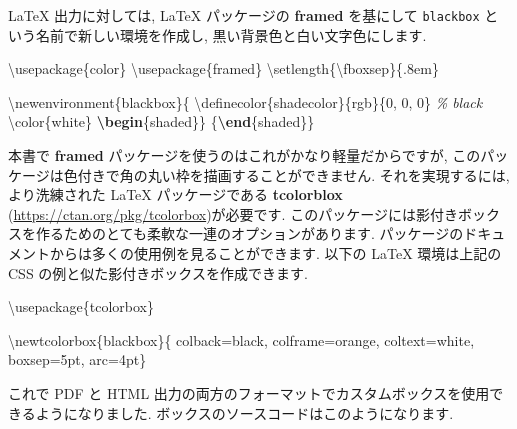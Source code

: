 \documentclass[
  11pt,
  lualatex,
  ja=standard]{bxjsreport}
\newenvironment{Shaded}{\begin{snugshade}}{\end{snugshade}}
\newcommand{\BuiltInTok}[1]{#1}
\newcommand{\CommentTok}[1]{\textcolor[rgb]{0.56,0.35,0.01}{\textit{#1}}}
\newcommand{\ExtensionTok}[1]{#1}
\newcommand{\FunctionTok}[1]{\textcolor[rgb]{0.00,0.00,0.00}{#1}}
\newcommand{\KeywordTok}[1]{\textcolor[rgb]{0.13,0.29,0.53}{\textbf{#1}}}
\newcommand{\NormalTok}[1]{#1}
\begin{document}
LaTeX 出力に対しては, LaTeX パッケージの \textbf{framed} を基にして \texttt{blackbox} という名前で新しい環境を作成し, 黒い背景色と白い文字色にします.

\begin{Shaded}
\begin{Highlighting}[numbers=left,,]
\BuiltInTok{\textbackslash{}usepackage}\NormalTok{\{}\ExtensionTok{color}\NormalTok{\}}
\BuiltInTok{\textbackslash{}usepackage}\NormalTok{\{}\ExtensionTok{framed}\NormalTok{\}}
\FunctionTok{\textbackslash{}setlength}\NormalTok{\{}\FunctionTok{\textbackslash{}fboxsep}\NormalTok{\}\{.8em\}}

\FunctionTok{\textbackslash{}newenvironment}\NormalTok{\{blackbox\}\{}
  \FunctionTok{\textbackslash{}definecolor}\NormalTok{\{shadecolor\}\{rgb\}\{0, 0, 0\}  }\CommentTok{\% black}
  \FunctionTok{\textbackslash{}color}\NormalTok{\{white\}}
  \KeywordTok{\textbackslash{}begin}\NormalTok{\{}\ExtensionTok{shaded}\NormalTok{\}\}}
\NormalTok{ \{}\KeywordTok{\textbackslash{}end}\NormalTok{\{}\ExtensionTok{shaded}\NormalTok{\}\}}
\end{Highlighting}
\end{Shaded}

本書で \textbf{framed} パッケージを使うのはこれがかなり軽量だからですが, このパッケージは色付きで角の丸い枠を描画することができません. それを実現するには, より洗練された LaTeX パッケージである \textbf{tcolorblox} (\url{https://ctan.org/pkg/tcolorbox})が必要です. このパッケージには影付きボックスを作るためのとても柔軟な一連のオプションがあります. パッケージのドキュメントからは多くの使用例を見ることができます. 以下の LaTeX 環境は上記の CSS の例と似た影付きボックスを作成できます.

\begin{Shaded}
\begin{Highlighting}[]
\BuiltInTok{\textbackslash{}usepackage}\NormalTok{\{}\ExtensionTok{tcolorbox}\NormalTok{\}}

\FunctionTok{\textbackslash{}newtcolorbox}\NormalTok{\{blackbox\}\{}
\NormalTok{  colback=black,}
\NormalTok{  colframe=orange,}
\NormalTok{  coltext=white,}
\NormalTok{  boxsep=5pt,}
\NormalTok{  arc=4pt\}}
\end{Highlighting}
\end{Shaded}

これで PDF と HTML 出力の両方のフォーマットでカスタムボックスを使用できるようになりました. ボックスのソースコードはこのようになります.
\end{document}
